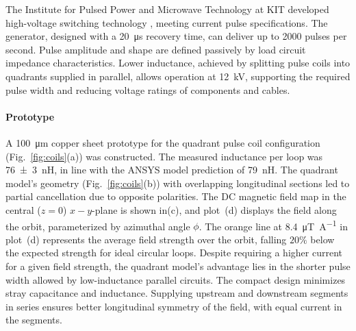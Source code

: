 \begin{refsection}
        \noindent
        The Institute for Pulsed Power and Microwave Technology at KIT developed high-voltage switching technology \cite{GateBoosting}, meeting current pulse specifications. 
        The generator, designed with a \SI{20}{\micro s} recovery time, can deliver up to 2000 pulses per second. 
        Pulse amplitude and shape are defined passively by load circuit impedance characteristics. 
        Lower inductance, achieved by splitting pulse coils into quadrants supplied in parallel, allows operation at \SI{12}{kV}, supporting the required pulse width and reducing voltage ratings of components and cables.

        \paragraph{Prototype}
        A \SI{100}{\micro m} copper sheet prototype for the quadrant pulse coil configuration (Fig.~\ref{fig:coils}(a)) was constructed.
        The measured inductance per loop was \SI{76(3)}{nH}, in line with the ANSYS model prediction of \SI{79}{nH}.
        The quadrant model's geometry (Fig.~\ref{fig:coils}(b)) with overlapping longitudinal sections led to partial cancellation due to opposite polarities. 
        The DC magnetic field map in the central ($z=0$) $x-y$-plane is shown in(c), and plot~(d) displays the field along the orbit, parameterized by azimuthal angle $\phi$.
        The orange line at \SI{8.4}{\micro\tesla\per\ampere} in plot~(d) represents the average field strength over the orbit, falling $20\%$ below the expected strength for ideal circular loops. 
        Despite requiring a higher current for a given field strength, the quadrant model's advantage lies in the shorter pulse width allowed by low-inductance parallel circuits. 
        The compact design minimizes stray capacitance and inductance. 
        Supplying upstream and downstream segments in series ensures better longitudinal symmetry of the field, with equal current in the segments.
        

\end{refsection}
